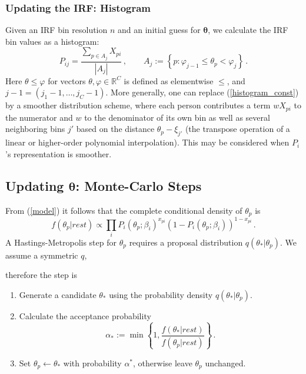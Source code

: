 \documentclass{article}
\newcommand{\bta}{\boldsymbol\ta}
\newcommand{\ta}{\theta}
\newcommand{\R}{\mathbb{R}}
\begin{document}
\subsubsection{Updating the IRF: Histogram}
\label{histogram}
Given an IRF bin resolution $n$ and an initial guess for $\bta$, we calculate the IRF bin values as a histogram:
\begin{equation}
	\label{histogram_const}
	P_{ij} = \frac{\sum_{p \in A_j} X_{pi}}{|A_j|}\,,\qquad
	A_j := \left\{ p : \varphi_{j-1} \leq \ta_p < \varphi_j \right\}\,.
\end{equation}
Here $\ta \leq \varphi$ for vectors $\ta,\varphi \in \R^C$ is defined as elementwise $\leq$, and $j-1 = (j_1-1,\dots,j_C-1)$.
More generally, one can replace (\ref{histogram_const}) by a smoother distribution scheme, where each person contributes a term $w X_{pi}$ to the numerator and $w$ to the denominator of its own bin as well as several neighboring bins $j'$ based on the distance $\theta_p - \xi_{j'}$ (the transpose operation of a linear or higher-order polynomial interpolation). This may be considered when $P_i$'s representation is smoother.

\subsection{Updating $\bta$: Monte-Carlo Steps}
\label{metropolis}
From (\ref{model}) it follows that the complete conditional density of $\ta_p$ is
\begin{equation}
  f(\ta_p|rest) \propto \prod_i 
  P_i(\ta_p;\beta_i)^{x_{pi}}\left(1 - P_i(\ta_p;\beta_i)\right)^{1-x_{pi}}\,.
  \label{cond_ta}
\end{equation}
A Hastings-Metropolis step for $\ta_p$ requires a proposal distribution $q(\ta_*|\ta_p)$. We assume a symmetric $q$, 



therefore the step is
\begin{enumerate}
	\item Generate a candidate $\ta_*$ using the probability density $q(\ta_*|\ta_p)$.
	\item Calculate the acceptance probability
	\begin{equation}
		\alpha_* := \min\left\{1, \frac{f(\ta_*|rest)}{f(\ta_p|rest)} \right\}\,.
	\end{equation}
	\item Set $\ta_p \leftarrow \ta_*$ with probability $\alpha^*$, otherwise leave $\ta_p$ unchanged.
\end{enumerate}
\end{document}
